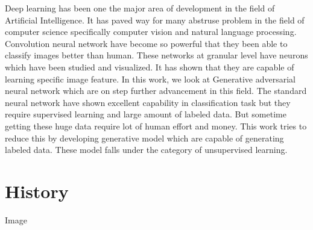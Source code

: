 


Deep learning has been one the major area of development in the field of Artificial Intelligence. It has paved way for many abstruse problem in the field of computer science specifically computer vision and natural language processing. Convolution neural network have become so powerful that they been able to classify images better than human. These networks at granular level have neurons which have been studied and visualized. It has shown that they are capable of learning specific image feature. In this work, we look at Generative adversarial neural network which are on step further advancement in this field. The standard neural network have shown excellent capability in classification task but they require supervised learning and large amount of labeled data. But sometime getting these huge data require lot of human effort and money. This work tries to reduce this by developing generative model which are capable of generating labeled data. These model falls under the category of unsupervised learning. 
\section{History}

Image 